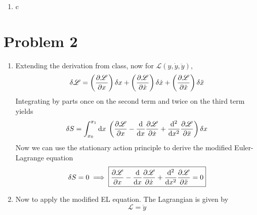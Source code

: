 \documentclass[12pt]{article}
\newcommand{\cint}[2]{\int_{#1}^{#2}}
\newcommand{\cintd}[3]{\cint{#1}{#2}\dd#3\:}
\begin{document}
\begin{enumerate}[label=(\alph*)]
\begin{align*}
        \pdv{\mathscr{L}}{\dot{\theta}} &= \frac{\dot{\theta}}{\sqrt{\dot{\theta}^2 + \sin^2\theta}} \\
        \dv{t}\pdv{\mathscr{L}}{\dot{\theta}} &= \frac{\ddot{\theta}}{\sqrt{\dot{\theta}^2 + \sin^2\theta}} - \frac{\dot{\theta}^2\left(\ddot{\theta} + \sin\theta\cos\theta\right)}{\left(\dot{\theta}^2 + \sin^2\theta\right)^{3/2}} 
    \end{align*}
    The Euler-Lagrange equation then gives
    \[ \frac{\sin\theta\cos\theta}{\sqrt{\dot{\theta}^2 + \sin^2\theta}} = \frac{\ddot{\theta}}{\sqrt{\dot{\theta}^2 + \sin^2\theta}} - \frac{\dot{\theta}^2\left(\ddot{\theta} + \sin\theta\cos\theta\right)}{\left(\dot{\theta}^2 + \sin^2\theta\right)^{3/2}} \]
    which simplifies (somewhat) to
    \[ \boxed{ \sin\theta\cos\theta = \ddot{\theta} - \frac{\dot{\theta}^2(\ddot{\theta} + \sin\theta\cos\theta)}{\left(\dot{\theta}^2 + \sin^2\theta\right)^3}} \]
    \item c
\end{enumerate}

\section*{Problem 2}
\begin{enumerate}[label=(\alph*)]
    \item Extending the derivation from class, now for $\mathscr{L}(y, \dot{y}, \ddot{y})$, 
    \[ \delta\mathscr{L} = \left(\pdv{\mathscr{L}}{x}\right)\delta x + \left(\pdv{\mathscr{L}}{\dot{x}}\right)\delta\dot{x} + \left(\pdv{\mathscr{L}}{\ddot{x}}\right)\delta\ddot{x} \]
    Integrating by parts once on the second term and twice on the third term yields
    \[ \delta S = \cintd{x_0}{x_1}{x} \left(\pdv{\mathscr{L}}{x} - \dv{x}\pdv{\mathscr{L}}{\dot{x}} + \dv[2]{x}\pdv{\mathscr{L}}{\ddot{x}}\right)\delta x \]
    Now we can use the stationary action principle to derive the modified Euler-Lagrange equation
    \[ \delta S = 0 \implies \boxed{\pdv{\mathscr{L}}{x} - \dv{x}\pdv{\mathscr{L}}{\dot{x}} + \dv[2]{x}\pdv{\mathscr{L}}{\ddot{x}} = 0} \]
    
    \item Now to apply the modified EL equation. The Lagrangian is given by
    \[ \mathscr{L} = \ddot{y} \]
\end{enumerate}
\end{document}
